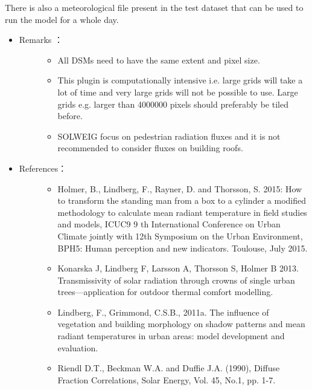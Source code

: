 \documentclass[letterpaper,10pt,english]{sphinxmanual}
\begin{document}
There is also a meteorological file present in the test dataset that can be used to run the model for a whole day.
\begin{itemize}
\item {} \begin{description}
\item[{Remarks ：}] \leavevmode\begin{itemize}
\item {} 
All DSMs need to have the same extent and pixel size.

\item {} 
This plugin is computationally intensive i.e. large grids will take a lot of time and very large grids will not be possible to use. Large grids e.g. larger than 4000000 pixels should preferably be tiled before.

\item {} 
SOLWEIG focus on pedestrian radiation fluxes and it is not recommended to consider fluxes on building roofs.

\end{itemize}

\end{description}

\item {} \begin{description}
\item[{References：}] \leavevmode\begin{itemize}
\item {} 
Holmer, B., Lindberg, F., Rayner, D. and Thorsson, S. 2015: How to transform the standing man from a box to a cylinder \textendash{} a modified methodology to calculate mean radiant temperature in field studies and models, ICUC9 \textendash{} 9 th International Conference on Urban Climate jointly with 12th Symposium on the Urban Environment, BPH5: Human perception and new indicators. Toulouse, July 2015.

\item {} 
Konarska J, Lindberg F, Larsson A, Thorsson S, Holmer B 2013. Transmissivity of solar radiation through crowns of single urban trees—application for outdoor thermal comfort modelling. 

\item {} 
Lindberg, F., Grimmond, C.S.B., 2011a. The influence of vegetation and building morphology on shadow patterns and mean radiant temperatures in urban areas: model development and evaluation. 

\item {} 
Riendl D.T., Beckman W.A. and Duffie J.A. (1990), Diffuse Fraction Correlations, Solar Energy, Vol. 45, No.1, pp. 1-7.

\end{itemize}

\end{description}

\end{itemize}
\end{document}
